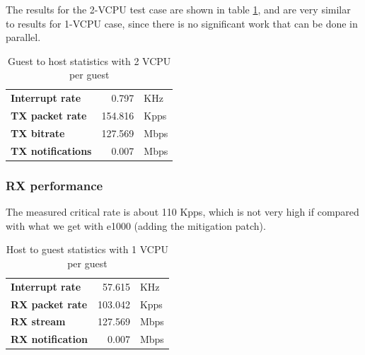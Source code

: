 \vspace{0.5cm}

The results for the 2-VCPU test case are shown in table \ref{tab:virtionet-tx-g2h2vcpu}, and are very similar to results for 1-VCPU case,
since there is no significant work that can be done in parallel.

\begin{table}
\begin{center}
\begin{tabular}{lrl}
\toprule
\textbf{Interrupt rate} & 0.797 & KHz\\
\textbf{TX packet rate} & 154.816 & Kpps\\
\textbf{TX bitrate} & 127.569 & Mbps\\
\textbf{TX notifications} & 0.007 & Mbps\\
\bottomrule
\end{tabular}
\end{center}
\caption{Guest to host statistics with 2 VCPU per guest}
\label{tab:virtionet-tx-g2h2vcpu}
\end{table}


\subsubsection{RX performance}
\label{sec:virtionet-perf-rx}
The measured critical rate is about 110 Kpps, which is not very high if compared with what we get with e1000 (adding the mitigation patch).

\begin{table}
\begin{center}
\begin{tabular}{lrl}
\toprule
\textbf{Interrupt rate} & 57.615 & KHz\\
\textbf{RX packet rate} & 103.042 & Kpps\\
\textbf{RX stream} & 127.569 & Mbps\\
\textbf{RX notification} & 0.007 & Mbps\\
\bottomrule
\end{tabular}
\end{center}
\caption{Host to guest statistics with 1 VCPU per guest}
\label{tab:virtionet-rx-g1hvcpu}
\end{table}

